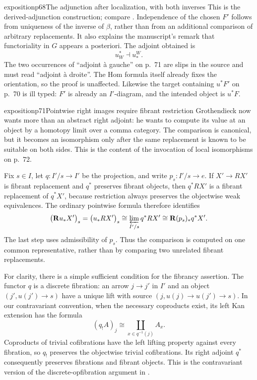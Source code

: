 \begin{dcomment}{exposition}{p68}{The adjunction after localization, with both inverses}
This is the derived-adjunction construction; compare \citet[Lemma 1.3.10]{Hovey1999}. Independence of the chosen $F'$ follows from uniqueness of the inverse of $\beta$, rather than from an additional comparison of arbitrary replacements. It also explains the manuscript's remark that functoriality in $G$ appears a posteriori. The adjoint obtained is
\[
                                u_W^*\dashv u_*^W.
\]
The two occurrences of ``adjoint \`a gauche'' on p.~71 are slips in the source and must read ``adjoint \`a droite''. The Hom formula itself already fixes the orientation, so the proof is unaffected. Likewise the target containing $u^*F'$ on p.~70 is ill typed: $F'$ is already an $I'$-diagram, and the intended object is $u^*F$.
\end{dcomment}

\begin{dcomment}{exposition}{p71}{Pointwise right images require fibrant restriction}
Grothendieck now wants more than an abstract right adjoint: he wants to compute its value at an object by a homotopy limit over a comma category. The comparison is canonical, but it becomes an isomorphism only after the same replacement is known to be suitable on both sides. This is the content of the invocation of local isomorphisms on p.~72.

Fix $s\in I$, let $q:I'/s\to I'$ be the projection, and write $p_s:I'/s\to e$. If $X'\to RX'$ is fibrant replacement and $q^*$ preserves fibrant objects, then $q^*RX'$ is a fibrant replacement of $q^*X'$, because restriction always preserves the objectwise weak equivalences. The ordinary pointwise formula therefore identifies
\[
 \bigl(\mathbf Ru_*X'\bigr)_s
   =\bigl(u_*RX'\bigr)_s
   \cong\varprojlim_{I'/s}q^*RX'
   \cong\mathbf R(p_s)_*q^*X'.
\]
The last step uses admissibility of $p_s$. Thus the comparison is computed on one common representative, rather than by comparing two unrelated fibrant replacements.

For clarity, there is a simple sufficient condition for the fibrancy assertion. The functor $q$ is a discrete fibration: an arrow $j\to j'$ in $I'$ and an object $(j',u(j')\to s)$ have a unique lift with source $(j,u(j)\to u(j')\to s)$. In our contravariant convention, when the necessary coproducts exist, its left Kan extension has the formula
\[
                           (q_!A)_j\cong\coprod_{x\in q^{-1}(j)}A_x.
\]
Coproducts of trivial cofibrations have the left lifting property against every fibration, so $q_!$ preserves the objectwise trivial cofibrations. Its right adjoint $q^*$ consequently preserves fibrations and fibrant objects. This is the contravariant version of the discrete-opfibration argument in \citet[Lemma 1.31]{Groth2013}.


\end{dcomment}
